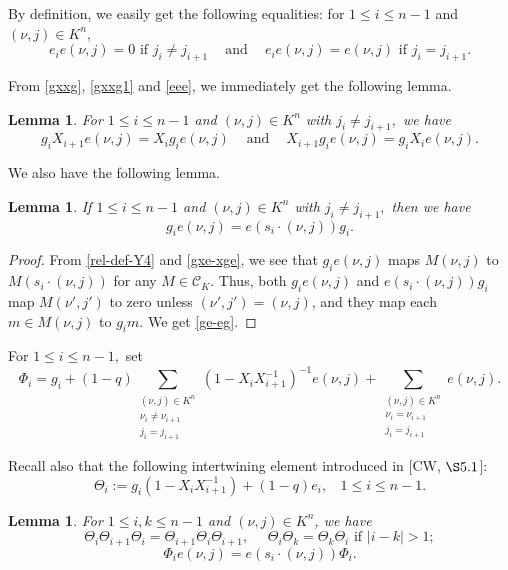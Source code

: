 \documentclass[11pt, reqno]{amsart} \textwidth=14.9cm \oddsidemargin=1cm \evensidemargin=1cm
\newtheorem{lemma}[theorem]{Lemma}
\theoremstyle{definition}
\numberwithin{equation}{section}
\begin{document}
By definition, we easily get the following equalities: for $1\leq i\leq n-1$ and $(\nu, j)\in K^{n}$,
\begin{equation}
e_{i}e(\nu, j)=0 \text{ if } j_{i}\neq j_{i+1} ~~~~\text{ and }~~~~e_{i}e(\nu, j)=e(\nu, j) \text{ if }j_{i}=j_{i+1}.\label{eee}
\end{equation}

From \eqref{gxxg}, \eqref{gxxg1} and \eqref{eee}, we immediately get the following lemma.

\begin{lemma}
For $1\leq i\leq n-1$ and $(\nu, j)\in K^{n}$ with $j_{i}\neq j_{i+1},$ we have
\begin{equation}
g_{i}X_{i+1}e(\nu, j)=X_{i}g_{i}e(\nu, j) ~~~~\text{ and }~~~~X_{i+1}g_{i}e(\nu, j)=g_{i}X_{i}e(\nu, j).\label{gxe-xge}
\end{equation}
\end{lemma}

We also have the following lemma.
\begin{lemma}
If $1\leq i\leq n-1$ and $(\nu, j)\in K^{n}$ with $j_{i}\neq j_{i+1},$ then we have
\begin{equation}
g_{i}e(\nu, j)=e(s_{i}\cdot(\nu, j))g_{i}.\label{ge-eg}
\end{equation}
\end{lemma}

\begin{proof}
From \eqref{rel-def-Y4} and \eqref{gxe-xge}, we see that $g_{i}e(\nu, j)$ maps $M(\nu, j)$ to $M(s_{i}\cdot(\nu, j))$ for any $M\in \mathcal{C}_{K}.$
Thus, both $g_{i}e(\nu, j)$ and $e(s_{i}\cdot(\nu, j))g_{i}$ map $M(\nu', j')$ to zero unless $(\nu', j')=(\nu, j)$, and they map each $m\in M(\nu, j)$ to $g_{i}m.$ We get \eqref{ge-eg}.
\end{proof}


For $1\leq i\leq n-1,$ set
\[\Phi_i=g_i + (1-q)\sum_{\substack{(\nu, j) \in K^{n} \\ \nu_i \neq \nu_{i+1} \\ j_i = j_{i+1}}} \left(1 - X_i X_{i+1}^{-1}\right)^{-1} e(\nu, j) + \sum_{\substack{(\nu, j) \in K^{n} \\ \nu_i = \nu_{i+1} \\ j_i = j_{i+1}}} e(\nu, j).
\]

Recall also that the following intertwining element introduced in [CW, $\S5.1$]:
$$\Theta_{i} :=g_{i}(1-X_{i}X_{i+1}^{-1})+(1-q)e_{i},~~~~1\leq i\leq n-1.$$


\begin{lemma}
For $1\leq i, k\leq n-1$ and $(\nu, j)\in K^{n}$, we have
\begin{equation}
\Theta_{i}\Theta_{i+1}\Theta_{i}=\Theta_{i+1}\Theta_{i}\Theta_{i+1},~~~~~~\Theta_{i}\Theta_{k}=\Theta_{k}\Theta_{i}\text{ if } \vert i-k\vert> 1;\label{theta}
\end{equation}
\begin{equation}
\Phi_{i}e(\nu, j)=e(s_{i}\cdot(\nu, j))\Phi_{i}.\label{phie-ephi}
\end{equation}
\end{lemma}
\end{document}
